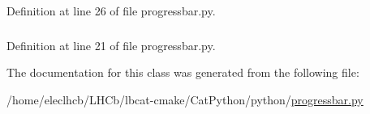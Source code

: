 Definition at line 26 of file progressbar.py.\hypertarget{classprogressbar_1_1ProgressBar_a818a39d7acf131db44f1ce01c3a1ea98}{
\subsubsection[{width}]{}}
\label{classprogressbar_1_1ProgressBar_a818a39d7acf131db44f1ce01c3a1ea98}


Definition at line 21 of file progressbar.py.

The documentation for this class was generated from the following file:\begin{DoxyCompactItemize}
\item 
/home/eleclhcb/LHCb/lbcat-\/cmake/CatPython/python/\hyperlink{progressbar_8py}{progressbar.py}\end{DoxyCompactItemize}
